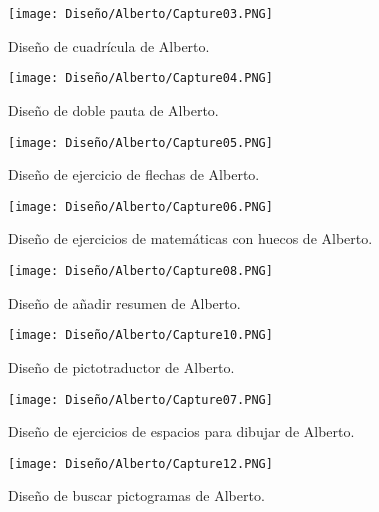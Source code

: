 \begin{figure}[ht!]
  \centering
  \texttt{[image: Diseño/Alberto/Capture03.PNG]}
  \caption{Diseño de cuadrícula de Alberto.}
  \label{Alberto3}
\end{figure}

\begin{figure}[ht!]
  \centering
  \texttt{[image: Diseño/Alberto/Capture04.PNG]}
  \caption{Diseño de doble pauta de Alberto.}
  \label{Alberto4}
\end{figure}

\begin{figure}[ht!]
  \centering
  \texttt{[image: Diseño/Alberto/Capture05.PNG]}
  \caption{Diseño de ejercicio de flechas de Alberto.}
  \label{Alberto5}
\end{figure}

\begin{figure}[ht!]
  \centering
  \texttt{[image: Diseño/Alberto/Capture06.PNG]}
  \caption{Diseño de ejercicios de matemáticas con huecos de Alberto.}
  \label{Alberto6}
\end{figure}

\begin{figure}[ht!]
  \centering
  \texttt{[image: Diseño/Alberto/Capture08.PNG]}
  \caption{Diseño de añadir resumen de Alberto.}
  \label{Alberto8}
\end{figure}

\begin{figure}[ht!]
  \centering
  \texttt{[image: Diseño/Alberto/Capture10.PNG]}
  \caption{Diseño de pictotraductor de Alberto.}
  \label{Alberto10}
\end{figure}

\begin{figure}[ht!]
  \centering
  \texttt{[image: Diseño/Alberto/Capture07.PNG]}
  \caption{Diseño de ejercicios de espacios para dibujar de Alberto.}
  \label{Alberto7}
\end{figure}

\begin{figure}[ht!]
  \centering
  \texttt{[image: Diseño/Alberto/Capture12.PNG]}
  \caption{Diseño de buscar pictogramas de Alberto.}
  \label{Alberto12}
\end{figure}
